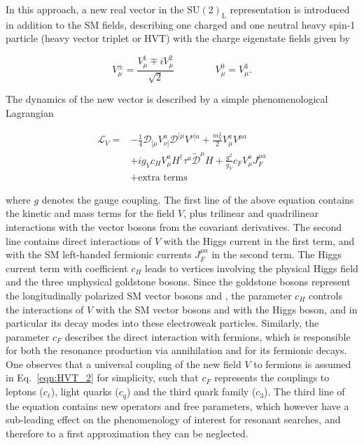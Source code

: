 In this approach, a new real vector in the $\mathrm{SU(2)_L}$ representation is introduced in addition to the SM fields, describing one charged and one neutral heavy spin-1 particle (heavy vector triplet or HVT) with the charge eigenstate fields given by

\begin{equation}\label{eqn:HVT_1}
V^\pm_\mu = \frac{V^1_\mu \mp iV^2_\mu}{\sqrt{2}} \, \qquad\qquad V^0_\mu = V^3_\mu.
\end{equation}

The dynamics of the new vector is described by a simple phenomenological Lagrangian

\begin{equation}\label{eqn:HVT_2}
\begin{split}
\mathcal{L}_V = & -\frac{1}{4}\mathcal{D}_{[\mu}V^a_{\nu]}\mathcal{D}^{[\mu}V^{\nu]a} + \frac{m^2_V}{2}V^a_\mu V^{\mu a}\\
 & + ig_Vc_HV^a_\mu H^\dag\tau^a\overleftrightarrow{\mathcal{D}}^\mu H + \frac{g^2}{g_V}c_FV^a_\mu J^{\mu a}_F\\
 & + \mbox{extra terms}
 \end{split}
\end{equation}

\noindent where $g$ denotes the gauge coupling.
The first line of the above equation contains the kinetic and mass terms for the field $V$, plus trilinear and quadrilinear interactions with the vector bosons from the covariant derivatives.
The second line contains direct interactions of $V$ with the Higgs current in the first term, and with the SM left-handed fermionic currents $J^{\mu a}_F$ in the second term.
The Higgs current term with coefficient $c_H$ leads to vertices involving the physical Higgs field and the three unphysical goldstone bosons.
Since the goldstone bosons represent the longitudinally polarized SM vector bosons \PW and \PZ, the parameter $c_H$ controls the interactions of $V$ with the SM vector bosons and with the Higgs boson, and in particular its decay modes into these electroweak particles.
Similarly, the parameter $c_F$ describes the direct interaction with fermions, which is responsible for both the resonance production via \qqbar annihilation and for its fermionic decays.
One observes that a universal coupling of the new field $V$ to fermions is assumed in Eq.~\ref{eqn:HVT_2} for simplicity, such that $c_F$ represents the couplings to leptons ($c_\ell$), light quarks ($c_q$) and the third quark family ($c_3$).
The third line of the equation contains new operators and free parameters, which however have a sub-leading effect on the phenomenology of interest for resonant searches, and
therefore to a first approximation they can be neglected.%

